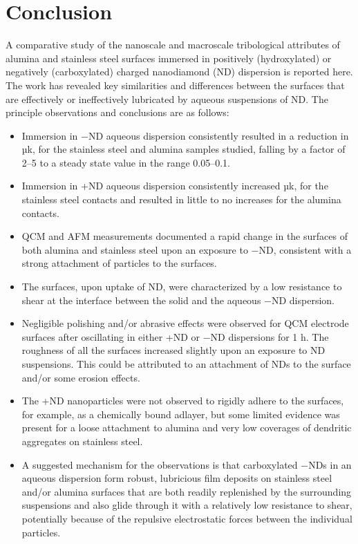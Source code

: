 \section{Conclusion}

A comparative study of the nanoscale and macroscale tribological attributes of alumina and stainless steel surfaces immersed in positively (hydroxylated) or negatively (carboxylated) charged nanodiamond (ND) dispersion is reported here. The work has revealed key similarities and differences between the surfaces that are effectively or ineffectively lubricated by aqueous suspensions of ND. The principle observations and conclusions are as follows:

\begin{itemize}
	\item Immersion in −ND aqueous dispersion consistently resulted in a reduction in µk, for the stainless steel and alumina samples studied, falling by a factor of 2–5 to a steady state value in the range 0.05–0.1.
	
	\item Immersion in +ND aqueous dispersion consistently increased µk, for the stainless steel contacts and resulted in little to no increases for the alumina contacts.
	
	\item QCM and AFM measurements documented a rapid change in the surfaces of both alumina and stainless steel upon an exposure to −ND, consistent with a strong attachment of particles to the surfaces.
	
	\item The surfaces, upon uptake of ND, were characterized by a low resistance to shear at the interface between the solid and the aqueous −ND dispersion.
	
	\item Negligible polishing and/or abrasive effects were observed for QCM electrode surfaces after oscillating in either +ND or −ND dispersions for 1 h. The roughness of all the surfaces increased slightly upon an exposure to ND suspensions. This could be attributed to an attachment of NDs to the surface and/or some erosion effects.
	
	\item The +ND nanoparticles were not observed to rigidly adhere to the surfaces, for example, as a chemically bound adlayer, but some limited evidence was present for a loose attachment to alumina and very low coverages of dendritic aggregates on stainless steel.
	
	\item A suggested mechanism for the observations is that carboxylated −NDs in an aqueous dispersion form robust, lubricious film deposits on stainless steel and/or alumina surfaces that are both readily replenished by the surrounding suspensions and also glide through it with a relatively low resistance to shear, potentially because of the repulsive electrostatic forces between the individual particles.
	
\end{itemize} 


